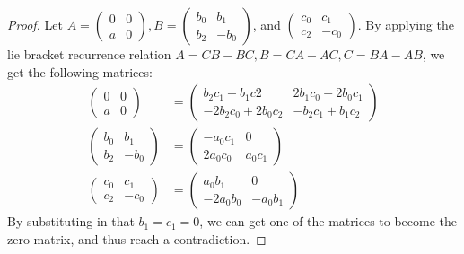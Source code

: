 \documentclass[12pt, letterpaper]{article}
\theoremstyle{definition}
\begin{document}
\begin{proof}
Let $A = \begin{pmatrix}
0 & 0\\
a & 0
\end{pmatrix}, B = \begin{pmatrix}
b_0 & b_1 \\
b_2 & -b_0
\end{pmatrix}$, and $\begin{pmatrix}
c_0 & c_1 \\
c_2 & -c_0
\end{pmatrix}$. By applying the lie bracket recurrence relation $A = CB-BC, B = CA - AC, C = BA - AB$, we get the following matrices:
\begin{align*}
\begin{pmatrix}
0 & 0\\
a & 0
\end{pmatrix} & = \begin{pmatrix}
b_2c_1 - b_1c2 & 2b_1c_0-2b_0c_1 \\
-2b_2c_0+2b_0c_2 & -b_2c_1 + b_1c_2
\end{pmatrix}\\
\begin{pmatrix}
b_0 & b_1 \\
b_2 & -b_0
\end{pmatrix} & = \begin{pmatrix}
-a_0c_1 & 0\\
2a_0c_0 & a_0c_1
\end{pmatrix} \\
\begin{pmatrix}
c_0 & c_1 \\
c_2 & -c_0
\end{pmatrix} & = \begin{pmatrix}
a_0b_1 & 0 \\
-2a_0b_0 & -a_0b_1
\end{pmatrix}
\end{align*}
By substituting in that $b_1 = c_1 = 0$, we can get one of the matrices to become the zero matrix, and thus reach a contradiction.
\end{proof}
\end{document}
